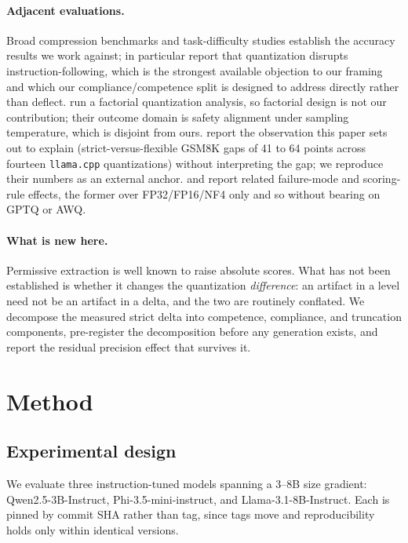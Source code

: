 \documentclass[conference]{IEEEtran}
\begin{document}
\paragraph{Adjacent evaluations.}
Broad compression benchmarks \citep{vonrad2026unicomp,wang2025slmquant} and
task-difficulty studies \citep{lee2025tradeoffs} establish the accuracy
results we work against; \citet{lee2025tradeoffs} in particular report that
quantization disrupts instruction-following, which is the strongest available
objection to our framing and which our compliance/competence split is designed
to address directly rather than deflect. \citet{prasad2026factorial} run a
factorial quantization analysis, so factorial design is not our contribution;
their outcome domain is safety alignment under sampling temperature, which is
disjoint from ours. \citet{kurt2026which} report the observation this paper
sets out to explain (strict-versus-flexible GSM8K gaps of 41 to 64 points
across fourteen \texttt{llama.cpp} quantizations) without interpreting the
gap; we reproduce their numbers as an external anchor.
\citet{oladri2026silent} and \citet{rasmussen2026calibration} report related
failure-mode and scoring-rule effects, the former over FP32/FP16/NF4 only and
so without bearing on GPTQ or AWQ.

\paragraph{What is new here.}
Permissive extraction is well known to raise absolute scores. What has not been
established is whether it changes the quantization \emph{difference}: an
artifact in a level need not be an artifact in a delta, and the two are
routinely conflated. We decompose the measured strict delta into competence,
compliance, and truncation components, pre-register the decomposition before any
generation exists, and report the residual precision effect that survives it.

\section{Method}
\label{sec:method}

\subsection{Experimental design}
\label{sec:design}
We evaluate three instruction-tuned models spanning a 3--8B size gradient:
Qwen2.5-3B-Instruct, Phi-3.5-mini-instruct, and Llama-3.1-8B-Instruct. Each is
pinned by commit SHA rather than tag, since tags move and reproducibility holds
only within identical versions.
\end{document}
